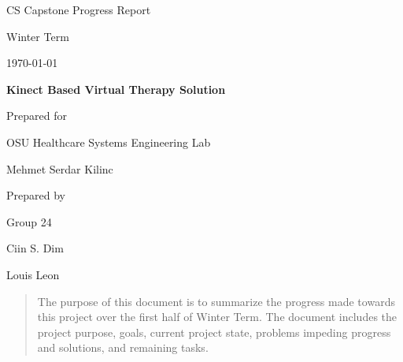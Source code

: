 \documentclass[onecolumn, draftclsnofoot,10pt, compsoc]{IEEEtran}
\def \CapstoneTeamName{     TeamName}
\def \CapstoneTeamNumber{       24}
\def \GroupMemberOne{            Ciin S. Dim}
\def \GroupMemberTwo{           Louis Leon}
\def \CapstoneProjectName{      Kinect Based Virtual Therapy Solution}
\def \CapstoneSponsorCompany{   OSU Healthcare Systems Engineering Lab}
\def \CapstoneSponsorPerson{        Mehmet Serdar Kilinc}
\def \DocType{      %
                Progress Report
                }
\newcommand{\NameSigPair}[1]{\par
\makebox[2.75in][r]{#1} \hfil   \makebox[3.25in]{\makebox[2.25in]{\hrulefill} \hfill        \makebox[.75in]{\hrulefill}}
\par\vspace{-12pt} \textit{\tiny\noindent
\makebox[2.75in]{} \hfil        \makebox[3.25in]{\makebox[2.25in][r]{Signature} \hfill  \makebox[.75in][r]{Date}}}}
\renewcommand{\NameSigPair}[1]{#1}
\begin{document}
\begin{titlepage}
    \begin{singlespace}
        \hfill 
        \par\vspace{.2in}
        \centering
        \scshape{
            \huge CS Capstone\DocType \par
            {\large Winter Term}\par
            {\large\today}\par
            \vspace{.5in}
            \textbf{\Huge\CapstoneProjectName}\par
            \vfill
            {\large Prepared for}\par
            \Huge \CapstoneSponsorCompany\par
            \vspace{5pt}
            {\Large\NameSigPair{\CapstoneSponsorPerson}\par}
            {\large Prepared by }\par
            Group\CapstoneTeamNumber\par
            \vspace{5pt}
            {\Large
                \NameSigPair{\GroupMemberOne}\par
                \NameSigPair{\GroupMemberTwo}\par
            }
            \vspace{20pt}
        }
        \begin{abstract}
        The purpose of this document is to summarize the progress made towards this project over the first half of Winter Term. The document includes the project purpose, goals, current project state, problems impeding progress and solutions, and remaining tasks.
    \end{abstract}     
    \end{singlespace}
\end{titlepage}
\newpage
{}
\tableofcontents
\listoffigures
\clearpage
\end{document}
